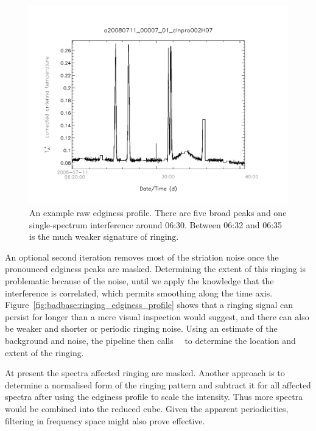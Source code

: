 \documentclass[final,authoryear,5p,times,twocolumn]{elsarticle}
\begin{document}
\begin{figure}[!ht]
\includegraphics[width=\columnwidth]{raw_edginess_profile}
\caption{An example raw edginess profile.  There are five broad
  peaks and one single-spectrum interference around 06:30.  Between
  06:32 and 06:35 is the much weaker signature of ringing.}
\label{fig:badbase:raw_edginess_profile}
\end{figure}

An optional second iteration removes most of the striation noise once
the pronounced edginess peaks are masked.  Determining the extent of
this ringing is problematic because of the noise, until we apply the
knowledge that the interference is correlated, which permits smoothing
along the time axis.
Figure~\ref{fig:badbase:ringing_edginess_profile} shows that a ringing
signal can persist for longer than a mere visual inspection would
suggest, and there can also be weaker and shorter or periodic ringing
noise.  Using an estimate of the background and noise, the pipeline
then calls \cupid\ \findclumps\ to determine the location and extent
of the ringing.

At present the spectra affected ringing are masked.  Another approach
is to determine a normalised form of the ringing pattern and subtract
it for all affected spectra after using the edginess profile to scale
the intensity.  Thus more spectra would be combined into the reduced
cube.  Given the apparent periodicities, filtering in frequency
space might also prove effective.
\end{document}
